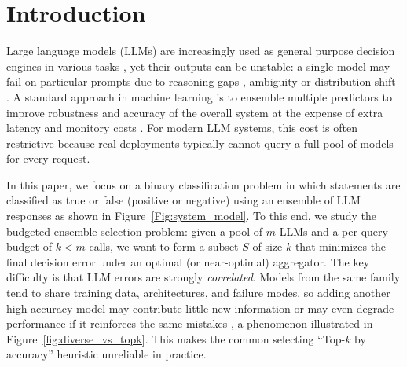 \documentclass{article}
\theoremstyle{plain}
\theoremstyle{definition}
\theoremstyle{remark}
\begin{document}
\section{Introduction}

Large language models (LLMs) are increasingly used as general purpose decision engines in various tasks \citep{minaee2025largelanguagemodelssurvey}, yet their outputs can be unstable: a single model may fail on particular prompts due to reasoning gaps \citep{huang-chang-2023-towards}, ambiguity \citep{lu-etal-2022-fantastically} or distribution shift \citep{yang2023rethinkingbenchmarkcontaminationlanguage}.
A standard approach in machine learning is to ensemble multiple predictors to improve robustness and accuracy of the overall system at the expense of extra latency and monitory costs \citep{bagging, dietterich, chen2025harnessingmultiplelargelanguage}. For modern LLM systems, this cost is often restrictive because real deployments typically cannot query a full pool of models for every request. 

In this paper, we focus on a binary classification problem in which statements are classified as true or false (positive or negative) using an ensemble of LLM responses as shown in Figure~\ref{Fig:system_model}. To this end, we study the budgeted ensemble selection problem: given a pool of $m$ LLMs and a per-query budget of $k < m$ calls, we want to form a subset $S$ of size $k$ that minimizes the final decision error under an optimal (or near-optimal) aggregator. The key difficulty is that LLM errors are strongly \emph{correlated}. Models from the same family tend to share training data, architectures, and failure modes, so adding another high-accuracy model may contribute little new information or may even degrade performance if it reinforces the same mistakes \citep{cemri2025multiagentllmsystemsfail, scalingagents}, a phenomenon illustrated in Figure~\ref{fig:diverse_vs_topk}. This makes the common selecting ``Top-$k$ by accuracy'' heuristic unreliable in practice. 
\end{document}
